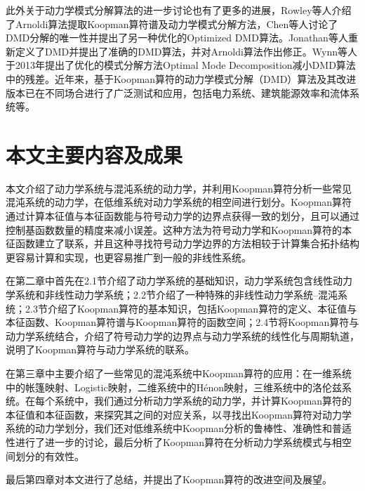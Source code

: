 此外关于动力学模式分解算法的进一步讨论也有了更多的进展，Rowley等人介绍了Arnoldi算法提取Koopman算符谱及动力学模式分解方法\cite{rowley2009spectral}，Chen等人讨论了DMD分解的唯一性并提出了另一种优化的Optimized DMD算法\cite{chen2012variants}。Jonathan等人重新定义了DMD并提出了准确的DMD算法\cite{tu2013dynamic}，并对Arnoldi算法作出修正。Wynn等人于2013年提出了优化的模式分解方法Optimal Mode Decomposition减小DMD算法中的残差。近年来，基于Koopman算符的动力学模式分解（DMD）算法及其改进版本已在不同场合进行了广泛测试和应用，包括电力系统\cite{susuki2011nonlinear,susuki2012nonlinear}、建筑能源效率\cite{eisenhower2010decomposing,georgescu2012creating}和流体系统\cite{schmid2011applications,bagheri2013koopman,mezic2013analysis}等。

\section{本文主要内容及成果}
本文介绍了动力学系统与混沌系统的动力学，并利用Koopman算符分析一些常见混沌系统的动力学，在低维系统对动力学系统的相空间进行划分。Koopman算符通过计算本征值与本征函数能与符号动力学的边界点获得一致的划分，且可以通过控制基函数数量的精度来减小误差。这种方法为符号动力学和Koopman算符的本征函数建立了联系，并且这种寻找符号动力学边界的方法相较于计算集合拓扑结构更容易计算和实现，也更容易推广到一般的非线性系统。

在第二章中首先在2.1节介绍了动力学系统的基础知识，动力学系统包含线性动力学系统和非线性动力学系统；2.2节介绍了一种特殊的非线性动力学系统--混沌系统；2.3节介绍了Koopman算符的基本知识，包括Koopman算符的定义、本征值与本征函数、Koopman算符谱与Koopman算符的函数空间；2.4节将Koopman算符与动力学系统结合，介绍了符号动力学的边界点与动力学系统的线性化与周期轨道，说明了Koopman算符与动力学系统的联系。

在第三章中主要介绍了一些常见的混沌系统中Koopman算符的应用：在一维系统中的帐篷映射、Logistic映射，二维系统中的H\'{e}non映射，三维系统中的洛伦兹系统。在每个系统中，我们通过分析动力学系统的动力学，并计算Koopman算符的本征值和本征函数，来探究其之间的对应关系，以寻找出Koopman算符对动力学系统的动力学划分，我们还对低维系统中Koopman分析的鲁棒性、准确性和普适性进行了进一步的讨论，最后分析了Koopman算符在分析动力学系统模式与相空间划分的有效性。

最后第四章对本文进行了总结，并提出了Koopman算符的改进空间及展望。


% 
% 
